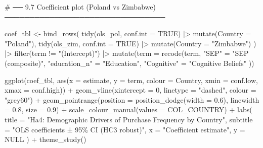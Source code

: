 \documentclass[
  letterpaper,
  DIV=11,
  numbers=noendperiod]{scrartcl}
\newenvironment{Shaded}{\begin{snugshade}}{\end{snugshade}}
\newcommand{\AttributeTok}[1]{\textcolor[rgb]{0.40,0.45,0.13}{#1}}
\newcommand{\CommentTok}[1]{\textcolor[rgb]{0.37,0.37,0.37}{#1}}
\newcommand{\ConstantTok}[1]{\textcolor[rgb]{0.56,0.35,0.01}{#1}}
\newcommand{\DecValTok}[1]{\textcolor[rgb]{0.68,0.00,0.00}{#1}}
\newcommand{\FloatTok}[1]{\textcolor[rgb]{0.68,0.00,0.00}{#1}}
\newcommand{\FunctionTok}[1]{\textcolor[rgb]{0.28,0.35,0.67}{#1}}
\newcommand{\NormalTok}[1]{\textcolor[rgb]{0.00,0.23,0.31}{#1}}
\newcommand{\OtherTok}[1]{\textcolor[rgb]{0.00,0.23,0.31}{#1}}
\newcommand{\SpecialCharTok}[1]{\textcolor[rgb]{0.37,0.37,0.37}{#1}}
\newcommand{\StringTok}[1]{\textcolor[rgb]{0.13,0.47,0.30}{#1}}
\begin{document}
\begin{Shaded}
\begin{Highlighting}[]
\CommentTok{\# ── 9.7  Coefficient plot (Poland vs Zimbabwe) ────────────────────────────────}

\NormalTok{coef\_tbl }\OtherTok{\textless{}{-}} \FunctionTok{bind\_rows}\NormalTok{(}
  \FunctionTok{tidy}\NormalTok{(ols\_pol, }\AttributeTok{conf.int =} \ConstantTok{TRUE}\NormalTok{) }\SpecialCharTok{|\textgreater{}} \FunctionTok{mutate}\NormalTok{(}\AttributeTok{Country =} \StringTok{"Poland"}\NormalTok{),}
  \FunctionTok{tidy}\NormalTok{(ols\_zim, }\AttributeTok{conf.int =} \ConstantTok{TRUE}\NormalTok{) }\SpecialCharTok{|\textgreater{}} \FunctionTok{mutate}\NormalTok{(}\AttributeTok{Country =} \StringTok{"Zimbabwe"}\NormalTok{)}
\NormalTok{) }\SpecialCharTok{|\textgreater{}}
  \FunctionTok{filter}\NormalTok{(term }\SpecialCharTok{!=} \StringTok{"(Intercept)"}\NormalTok{) }\SpecialCharTok{|\textgreater{}}
  \FunctionTok{mutate}\NormalTok{(}\AttributeTok{term =} \FunctionTok{recode}\NormalTok{(term,}
    \StringTok{"SEP"}         \OtherTok{=} \StringTok{"SEP (composite)"}\NormalTok{,}
    \StringTok{"education\_n"} \OtherTok{=} \StringTok{"Education"}\NormalTok{,}
    \StringTok{"Cognitive"}   \OtherTok{=} \StringTok{"Cognitive Beliefs"}
\NormalTok{  ))}

\FunctionTok{ggplot}\NormalTok{(coef\_tbl,}
                \FunctionTok{aes}\NormalTok{(}\AttributeTok{x =}\NormalTok{ estimate, }\AttributeTok{y =}\NormalTok{ term, }\AttributeTok{colour =}\NormalTok{ Country,}
                    \AttributeTok{xmin =}\NormalTok{ conf.low, }\AttributeTok{xmax =}\NormalTok{ conf.high)) }\SpecialCharTok{+}
  \FunctionTok{geom\_vline}\NormalTok{(}\AttributeTok{xintercept =} \DecValTok{0}\NormalTok{, }\AttributeTok{linetype =} \StringTok{"dashed"}\NormalTok{, }\AttributeTok{colour =} \StringTok{"grey60"}\NormalTok{) }\SpecialCharTok{+}
  \FunctionTok{geom\_pointrange}\NormalTok{(}\AttributeTok{position =} \FunctionTok{position\_dodge}\NormalTok{(}\AttributeTok{width =} \FloatTok{0.6}\NormalTok{),}
                  \AttributeTok{linewidth =} \FloatTok{0.8}\NormalTok{, }\AttributeTok{size =} \FloatTok{0.9}\NormalTok{) }\SpecialCharTok{+}
  \FunctionTok{scale\_colour\_manual}\NormalTok{(}\AttributeTok{values =}\NormalTok{ COL\_COUNTRY) }\SpecialCharTok{+}
  \FunctionTok{labs}\NormalTok{(}
    \AttributeTok{title    =} \StringTok{"Ha4: Demographic Drivers of Purchase Frequency by Country"}\NormalTok{,}
    \AttributeTok{subtitle =} \StringTok{"OLS coefficients ± 95\% CI (HC3 robust)"}\NormalTok{,}
    \AttributeTok{x =} \StringTok{"Coefficient estimate"}\NormalTok{, }\AttributeTok{y =} \ConstantTok{NULL}
\NormalTok{  ) }\SpecialCharTok{+}
  \FunctionTok{theme\_study}\NormalTok{()}
\end{Highlighting}
\end{Shaded}
\end{document}
